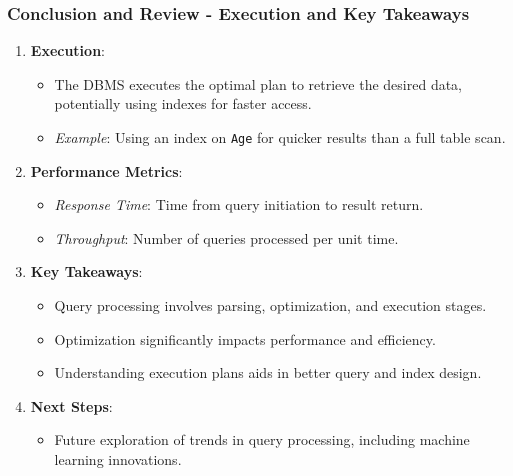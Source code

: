 \documentclass[aspectratio=169]{beamer}
\begin{document}
\begin{frame}[fragile]
    \frametitle{Conclusion and Review - Execution and Key Takeaways}
    \begin{enumerate}[resume]
        \item \textbf{Execution}:
        \begin{itemize}
            \item The DBMS executes the optimal plan to retrieve the desired data, potentially using indexes for faster access.
            \item \textit{Example}: Using an index on \texttt{Age} for quicker results than a full table scan.
        \end{itemize}

        \item \textbf{Performance Metrics}:
        \begin{itemize}
            \item \textit{Response Time}: Time from query initiation to result return.
            \item \textit{Throughput}: Number of queries processed per unit time.
        \end{itemize}

        \item \textbf{Key Takeaways}:
        \begin{itemize}
            \item Query processing involves parsing, optimization, and execution stages.
            \item Optimization significantly impacts performance and efficiency.
            \item Understanding execution plans aids in better query and index design.
        \end{itemize}
        
        \item \textbf{Next Steps}:
        \begin{itemize}
            \item Future exploration of trends in query processing, including machine learning innovations.
        \end{itemize}
    \end{enumerate}
\end{frame}
\end{document}
